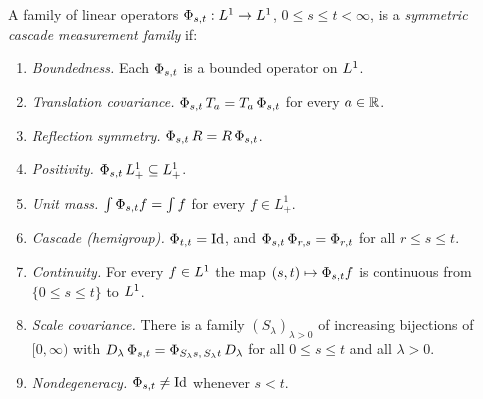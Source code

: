 \begin{definition}\label{def:cascade-family}
\leanok
{}
A family of linear operators $\Phi_{s,t} : L^1 \to L^1$, $0 \le s \le t < \infty$, is a
\emph{symmetric cascade measurement family} if:
\begin{enumerate}
\item[(A1)] \emph{Boundedness.} Each $\Phi_{s,t}$ is a bounded operator on $L^1$.
\item[(A2)] \emph{Translation covariance.} $\Phi_{s,t}\,T_{a} = T_{a}\,\Phi_{s,t}$ for
every $a \in \mathbb{R}$.
\item[(A3)] \emph{Reflection symmetry.} $\Phi_{s,t}\,R = R\,\Phi_{s,t}$.
\item[(A4)] \emph{Positivity.} $\Phi_{s,t}\,L^1_+ \subseteq L^1_+$.
\item[(A5)] \emph{Unit mass.} $\int \Phi_{s,t} f = \int f$ for every $f \in L^1_+$.
\item[(A6)] \emph{Cascade (hemigroup).} $\Phi_{t,t} = \mathrm{Id}$, and
$\Phi_{s,t}\,\Phi_{r,s} = \Phi_{r,t}$ for all $r \le s \le t$.
\item[(A7)] \emph{Continuity.} For every $f \in L^1$ the map $(s,t) \mapsto \Phi_{s,t}f$ is
continuous from $\{0 \le s \le t\}$ to $L^1$.
\item[(A8)] \emph{Scale covariance.} There is a family $(S_\lambda)_{\lambda > 0}$ of
increasing bijections of $[0,\infty)$ with
$D_{\lambda}\,\Phi_{s,t} = \Phi_{S_\lambda s,\,S_\lambda t}\,D_{\lambda}$ for all
$0 \le s \le t$ and all $\lambda > 0$.
\item[(ND)] \emph{Nondegeneracy.} $\Phi_{s,t} \ne \mathrm{Id}$ whenever $s < t$.
\end{enumerate}
\statusT
\end{definition}


